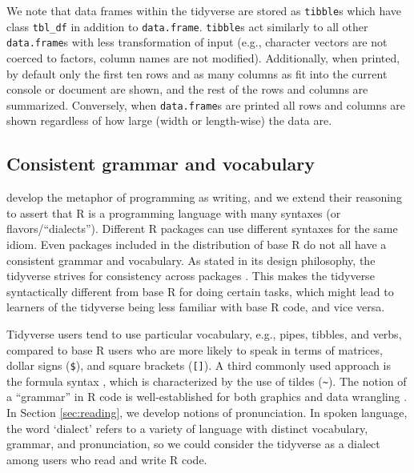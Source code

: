 \documentclass[12pt]{article}
\begin{document}
We note that data frames within the tidyverse are stored as
\texttt{tibble}s which have class \texttt{tbl\_df} in addition to
\texttt{data.frame}. \texttt{tibble}s act similarly to all other
\texttt{data.frame}s with less transformation of input (e.g., character
vectors are not coerced to factors, column names are not modified).
Additionally, when printed, by default only the first ten rows and as
many columns as fit into the current console or document are shown, and
the rest of the rows and columns are summarized. Conversely, when
\texttt{data.frame}s are printed all rows and columns are shown
regardless of how large (width or length-wise) the data are.

\hypertarget{consistent-grammar-and-vocabulary}{%
\subsection{Consistent grammar and
vocabulary}\label{consistent-grammar-and-vocabulary}}

\citet{hermans2017writing} develop the metaphor of programming as
writing, and we extend their reasoning to assert that R is a programming
language with many syntaxes (or flavors/``dialects''). Different R
packages can use different syntaxes for the same idiom. Even packages
included in the distribution of base R do not all have a consistent
grammar and vocabulary. As stated in its design philosophy, the
tidyverse strives for consistency across packages
\citep{tidyverse-style}. This makes the tidyverse syntactically
different from base R for doing certain tasks, which might lead to
learners of the tidyverse being less familiar with base R code, and vice
versa.

Tidyverse users tend to use particular vocabulary, e.g., pipes, tibbles,
and verbs, compared to base R users who are more likely to speak in
terms of matrices, dollar signs (\texttt{\$}), and square brackets
(\texttt{{[}{]}}). A third commonly used approach is the formula syntax
\citep{Pruim2017}, which is characterized by the use of tildes
(\texttt{\textasciitilde{}}). The notion of a ``grammar'' in R code is
well-established for both graphics
\citep{wilkinson2012grammar, R-ggplot2} and data wrangling
\citep{R-dplyr}. In Section \ref{sec:reading}, we develop notions of
pronunciation. In spoken language, the word `dialect' refers to a
variety of language with distinct vocabulary, grammar, and
pronunciation, so we could consider the tidyverse as a dialect among
users who read and write R code.
\end{document}
